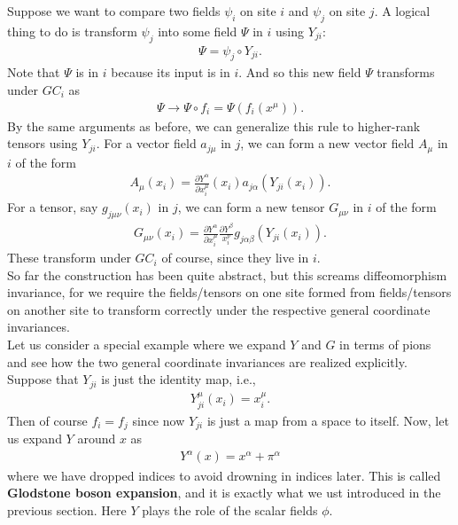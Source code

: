 \documentclass{book}
\theoremstyle{definition}
\newcommand{\p}{\partial}
\newcommand{\f}[2]{\frac{#1}{#2}}
\begin{document}
Suppose we want to compare two fields $\psi_i$ on site $i$ and $\psi_j$ on site $j$. A logical thing to do is transform $\psi_j$ into some field $\Psi$ in $i$ using $Y_{ji}$:
\begin{align}
\Psi = \psi_j \circ Y_{ji}.
\end{align}
Note that $\Psi$ is in $i$ because its input is in $i$. And so this new field $\Psi$ transforms under $GC_i$ as
\begin{align}
\Psi \to \Psi \circ f_i = \Psi(f_i(x^\mu)).
\end{align}
By the same arguments as before, we can generalize this rule to higher-rank tensors using $Y_{ji}$. For a vector field $a_{j\mu}$ in $j$, we can form a new vector field $A_\mu$ in $i$ of the form
\begin{align}
A_\mu(x_i) = \f{\p Y^\alpha}{\p x_i^\mu}(x_i) a_{j\alpha}(Y_{ji}(x_i)).
\end{align}
For a tensor, say $g_{j\mu\nu}(x_i)$ in $j$, we can form a new tensor $G_{\mu\nu}$ in $i$ of the form
\begin{align}
G_{\mu\nu}(x_i) = \f{\p Y^\alpha}{\p x_i^\mu}\f{\p Y^\beta}{x_i^\nu}g_{j\alpha\beta}(Y_{ji}(x_i)).
\end{align}
These transform under $GC_i$ of course, since they live in $i$.\\

So far the construction has been quite abstract, but this screams diffeomorphism invariance, for we require the fields/tensors on one site formed from fields/tensors on another site to transform correctly under the respective general coordinate invariances. \\

Let us consider a special example where we expand $Y$ and $G$ in terms of pions and see how the two general coordinate invariances are realized explicitly. Suppose that $Y_{ji}$ is just the identity map, i.e.,
\begin{align}
Y_{ji}^\mu(x_i) = x^\mu_i.
\end{align}
Then of course $f_i = f_j$ since now $Y_{ji}$ is just a map from a space to itself. Now, let us expand $Y$ around $x$ as
\begin{align}
Y^\alpha(x) = x^\alpha + \pi^\alpha 
\end{align}
where we have dropped indices to avoid drowning in indices later. This is called \textbf{Glodstone boson expansion}, and it is exactly what we ust introduced in the previous section. Here $Y$ plays the role of the scalar fields $\phi$. \\
\end{document}
